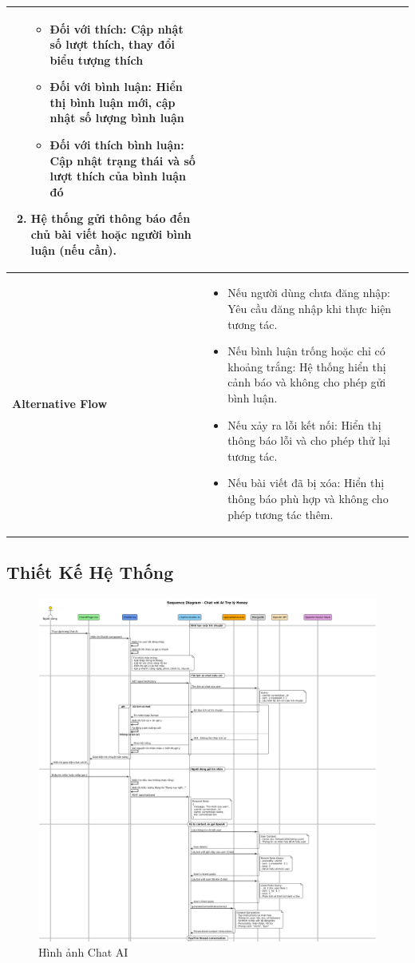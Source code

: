 \begin{longtable}{|>{\bfseries}m{4cm}|m{10cm}|}
\begin{enumerate}
\begin{itemize}
         \item Đối với thích: Cập nhật số lượt thích, thay đổi biểu tượng thích
         \item Đối với bình luận: Hiển thị bình luận mới, cập nhật số lượng bình luận
         \item Đối với thích bình luận: Cập nhật trạng thái và số lượt thích của bình luận đó
       \end{itemize}
    \item Hệ thống gửi thông báo đến chủ bài viết hoặc người bình luận (nếu cần).
\end{enumerate} \\
\hline
Alternative Flow &
\begin{itemize}
    \item Nếu người dùng chưa đăng nhập: Yêu cầu đăng nhập khi thực hiện tương tác.
    \item Nếu bình luận trống hoặc chỉ có khoảng trắng: Hệ thống hiển thị cảnh báo và không cho phép gửi bình luận.
    \item Nếu xảy ra lỗi kết nối: Hiển thị thông báo lỗi và cho phép thử lại tương tác.
    \item Nếu bài viết đã bị xóa: Hiển thị thông báo phù hợp và không cho phép tương tác thêm.
\end{itemize} \\
\hline
\end{longtable}



\subsection{Thiết Kế Hệ Thống}

\begin{figure}[H]
    \centering
    \includegraphics[width=1\textwidth]{image/sequence/chat-ai.png}
    \caption{Hình ảnh Chat AI}
    \label{fig:chat_ai}
\end{figure}


